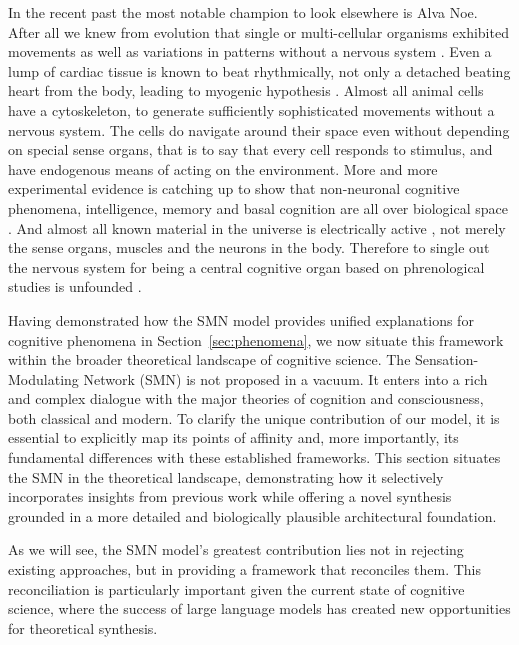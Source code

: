  In the recent past the most notable champion to look elsewhere is Alva Noe. After all we knew from evolution that single or multi-cellular organisms exhibited movements as well as variations in patterns without a nervous system \citep{llinas2002vortex}. Even a lump of cardiac tissue is known to beat rhythmically, not only a detached beating heart from the body, leading to myogenic hypothesis \citep{landecker2007culturing}. Almost all animal cells have a cytoskeleton, to generate sufficiently sophisticated movements without a nervous system. The cells do navigate around their space even without depending on special sense organs, that is to say that every cell responds to stimulus, and have endogenous means of acting on the environment. More and more experimental evidence is catching up to show that non-neuronal cognitive phenomena, intelligence, memory and basal cognition are all over biological space \citep{Levin2023, biomimetics-Levin2023}. And almost all known material in the universe is electrically active \citep{Peratt1996plasma}, not merely the sense organs, muscles and the neurons in the body. Therefore to single out the nervous system for being a central cognitive organ based on phrenological studies is unfounded \citep{anderson2014phrenology}.


Having demonstrated how the SMN model provides unified explanations for cognitive phenomena in Section~\ref{sec:phenomena}, we now situate this framework within the broader theoretical landscape of cognitive science. The Sensation-Modulating Network (SMN) is not proposed in a vacuum. It enters into a rich and complex dialogue with the major theories of cognition and consciousness, both classical and modern. To clarify the unique contribution of our model, it is essential to explicitly map its points of affinity and, more importantly, its fundamental differences with these established frameworks. This section situates the SMN in the theoretical landscape, demonstrating how it selectively incorporates insights from previous work while offering a novel synthesis grounded in a more detailed and biologically plausible architectural foundation.

As we will see, the SMN model's greatest contribution lies not in rejecting existing approaches, but in providing a framework that reconciles them. This reconciliation is particularly important given the current state of cognitive science, where the success of large language models has created new opportunities for theoretical synthesis.

